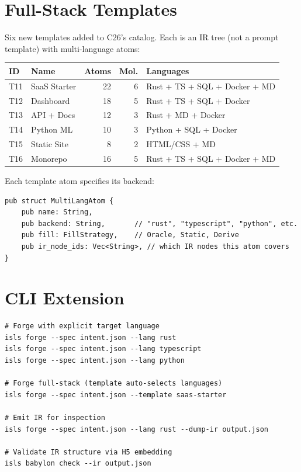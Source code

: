 \documentclass[11pt,a4paper,twoside]{article}
\theoremstyle{definition}
\theoremstyle{plain}
\theoremstyle{remark}
\begin{document}
\section{Full-Stack Templates}\label{sec:templates}

Six new templates added to C26's catalog. Each is an IR tree (not a
prompt template) with multi-language atoms:

\begin{tabularx}{\textwidth}{l l r r X}
\toprule
\textbf{ID} & \textbf{Name} & \textbf{Atoms} & \textbf{Mol.} &
  \textbf{Languages} \\
\midrule
T11 & SaaS Starter & 22 & 6 & Rust + TS + SQL + Docker + MD \\
T12 & Dashboard & 18 & 5 & Rust + TS + SQL + Docker \\
T13 & API + Docs & 12 & 3 & Rust + MD + Docker \\
T14 & Python ML & 10 & 3 & Python + SQL + Docker \\
T15 & Static Site & 8 & 2 & HTML/CSS + MD \\
T16 & Monorepo & 16 & 5 & Rust + TS + SQL + Docker + MD \\
\bottomrule
\end{tabularx}

Each template atom specifies its backend:
\begin{lstlisting}
pub struct MultiLangAtom {
    pub name: String,
    pub backend: String,       // "rust", "typescript", "python", etc.
    pub fill: FillStrategy,    // Oracle, Static, Derive
    pub ir_node_ids: Vec<String>, // which IR nodes this atom covers
}
\end{lstlisting}


\section{CLI Extension}\label{sec:cli}

\begin{lstlisting}
# Forge with explicit target language
isls forge --spec intent.json --lang rust
isls forge --spec intent.json --lang typescript
isls forge --spec intent.json --lang python

# Forge full-stack (template auto-selects languages)
isls forge --spec intent.json --template saas-starter

# Emit IR for inspection
isls forge --spec intent.json --lang rust --dump-ir output.json

# Validate IR structure via H5 embedding
isls babylon check --ir output.json
\end{lstlisting}
\end{document}
